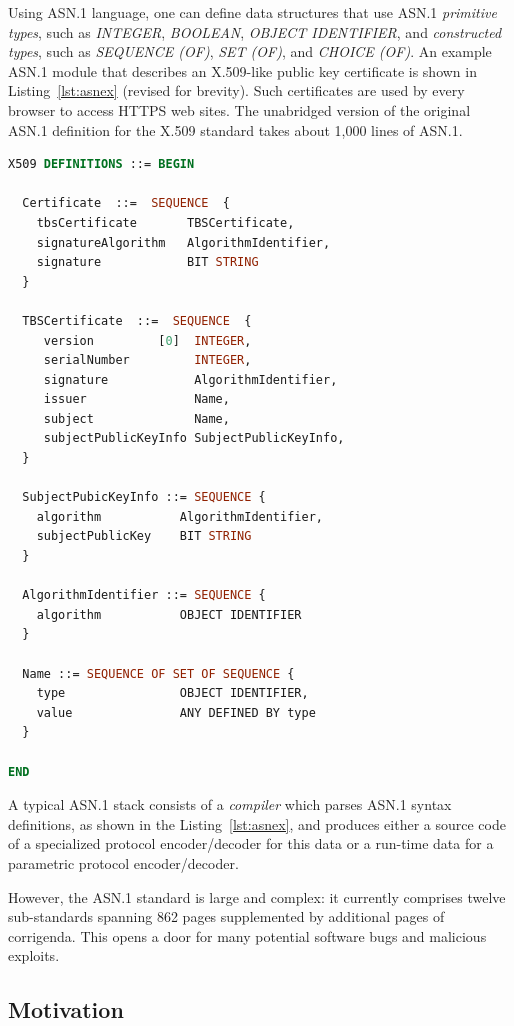 \documentclass[10p,conference]{IEEEtran}
\begin{document}
Using ASN.1 language, one can define data structures that use
ASN.1 {\it primitive types}, such as \emph{INTEGER}, \emph{BOOLEAN}, \emph{OBJECT
IDENTIFIER}, and {\it constructed types}, such as \emph{SEQUENCE (OF)},
\emph{SET (OF)}, and \emph{CHOICE (OF)}. An example ASN.1 module that describes an X.509-like public key certificate is shown in Listing~\ref{lst:asnex} (revised for brevity). Such certificates are
used by every browser to access HTTPS web sites. The unabridged
version of the original ASN.1 definition for the X.509 standard takes
about 1,000 lines of ASN.1. 

\begin{lstlisting}[language=ASN1,label=lst:asnex,
  caption={ASN.1 example of X.509 certificates}]
X509 DEFINITIONS ::= BEGIN

  Certificate  ::=  SEQUENCE  {
    tbsCertificate       TBSCertificate,
    signatureAlgorithm   AlgorithmIdentifier,
    signature            BIT STRING
  }

  TBSCertificate  ::=  SEQUENCE  {
     version         [0]  INTEGER,
     serialNumber         INTEGER,
     signature            AlgorithmIdentifier,
     issuer               Name,
     subject              Name,
     subjectPublicKeyInfo SubjectPublicKeyInfo,
  }

  SubjectPubicKeyInfo ::= SEQUENCE {
    algorithm           AlgorithmIdentifier,
    subjectPublicKey    BIT STRING
  }

  AlgorithmIdentifier ::= SEQUENCE {
    algorithm           OBJECT IDENTIFIER
  }

  Name ::= SEQUENCE OF SET OF SEQUENCE {
    type                OBJECT IDENTIFIER,
    value               ANY DEFINED BY type
  }

END
\end{lstlisting}


A typical ASN.1 stack consists of a \textit{compiler} which parses
ASN.1 syntax definitions, as shown in the Listing~\ref{lst:asnex}, and
produces either a source code of a specialized protocol encoder/decoder for this data or a run-time data for a parametric protocol
encoder/decoder.

However, the ASN.1 standard is large and complex:
it currently comprises twelve sub-standards spanning 862 pages
supplemented by additional pages of corrigenda. This opens
a door for many potential software bugs and malicious exploits.
  
\subsection{Motivation}
\end{document}
